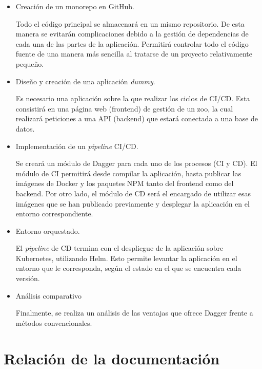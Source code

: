 \begin{itemize}
  \item Creación de un monorepo\cite{monorepo} en GitHub.

    Todo el código principal se almacenará en un mismo repositorio. De esta manera se evitarán complicaciones debido a la gestión de dependencias de cada una de las partes de la aplicación. Permitirá controlar todo el código fuente de una manera más sencilla al tratarse de un proyecto relativamente pequeño.
  \item Diseño y creación de una aplicación \textit{dummy}.

    Es necesario una aplicación sobre la que realizar los ciclos de CI/CD. Esta consistirá en una página web (frontend) de gestión de un zoo, la cual realizará peticiones a una API (backend) que estará conectada a una base de datos.
  \item Implementación de un \textit{pipeline} CI/CD.

    Se creará un módulo de Dagger para cada uno de los procesos (CI y CD). El módulo de CI permitirá desde compilar la aplicación, hasta publicar las imágenes de Docker y los paquetes NPM tanto del frontend como del backend. Por otro lado, el módulo de CD será el encargado de utilizar esas imágenes que se han publicado previamente y desplegar la aplicación en el entorno correspondiente.
  \item Entorno orquestado.

    El \textit{pipeline} de CD termina con el despliegue de la aplicación sobre Kubernetes\cite{kubernetes}, utilizando Helm\cite{helm}. Esto permite levantar la aplicación en el entorno que le corresponda, según el estado en el que se encuentra cada versión.

  \item Análisis comparativo

    Finalmente, se realiza un análisis de las ventajas que ofrece Dagger frente a métodos convencionales.
\end{itemize}

\section{Relación de la documentación}

